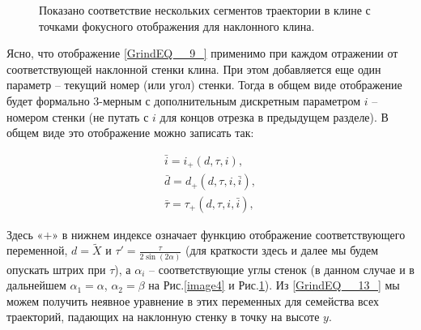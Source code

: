 \documentclass[a4paper]{article}
\begin{document}
\begin{figure}[h]
\caption{Показано соответствие нескольких сегментов траектории в клине с точками фокусного отображения для наклонного клина. }
\label{image10}
\end{figure}


Ясно, что отображение \eqref{GrindEQ__9_} 
 применимо при каждом отражении от соответствующей наклонной стенки клина. При этом добавляется еще один параметр -- текущий номер (или угол) стенки. Тогда в общем виде отображение будет формально 3-мерным с дополнительным дискретным параметром $i$ -- номером стенки (не путать с $i$ для концов отрезка в предыдущем разделе). В общем виде это отображение можно записать так:

\begin{equation} \label{GrindEQ__20_}
 \begin{array}{l}
  {\bar{i}=i_{+} \left(d,\tau ,i\right),} \\ {\bar{d}=d_{+} \left(d,\tau ,i,\bar{i}\right),} \\ {\bar{\tau }=\tau _{+} \left(d,\tau ,i,\bar{i}\right),}
   \end{array}
    \end{equation}

Здесь «$+$» в нижнем индексе означает функцию отображение соответствующего переменной, $d =\tilde{X} $ и $\tau '=\frac{\tau }{2 \sin (2 \alpha )}$ (для краткости здесь и далее мы будем опускать штрих при $\tau$), а $\alpha _{i} $ -- соответствующие углы стенок (в данном случае и в дальнейшем $\alpha _{1} =\alpha$, $\alpha _{2} =\beta $ на Рис.\ref{image4} и Рис.\ref{image10}).
Из \eqref{GrindEQ__13_} мы можем получить неявное уравнение в этих переменных для семейства всех траекторий, падающих на наклонную стенку в точку на высоте $y$.
\end{document}
